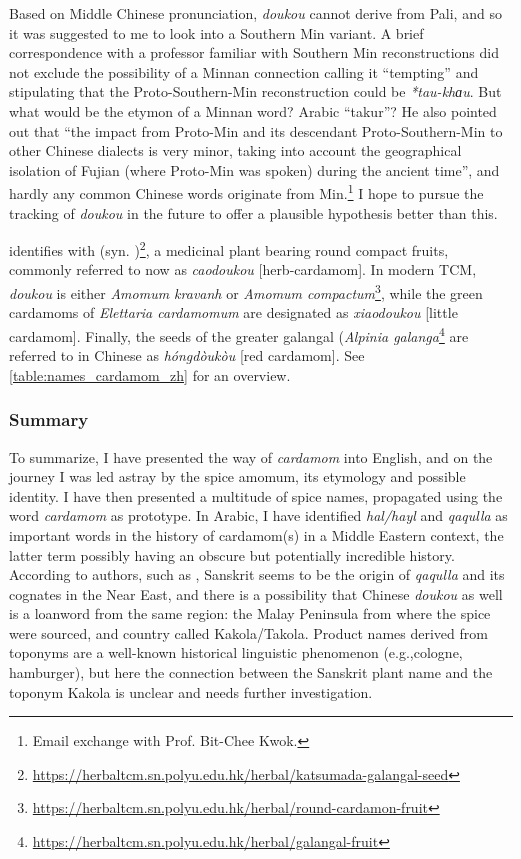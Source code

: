 Based on Middle Chinese pronunciation, \textit{doukou} cannot derive from Pali, and so it was suggested to me to look into a Southern Min variant. 
A brief correspondence with a professor familiar with Southern Min reconstructions did not exclude the possibility of a Minnan connection calling it ``tempting'' and stipulating that the Proto-Southern-Min reconstruction could be \textit{*tau-khɑu}. But what would be the etymon of a Minnan word? Arabic ``takur''? He also pointed out that ``the impact from Proto-Min and its descendant Proto-Southern-Min to other Chinese dialects is very minor, taking into account the geographical isolation of Fujian (where Proto-Min was spoken) during the ancient time'', and hardly any common Chinese words originate from Min.\footnote{Email exchange with Prof. Bit-Chee Kwok.} I hope to pursue the tracking of \textit{doukou} in the future to offer a plausible hypothesis better than this.



\textcite[729]{zhang_dictionary_2015} identifies  with  (syn. )\footnote{\url{https://herbaltcm.sn.polyu.edu.hk/herbal/katsumada-galangal-seed}}, a medicinal plant bearing round compact fruits, commonly referred to now as  \textit{caodoukou} [herb-cardamom]. In modern \gls{TCM}, \textit{doukou} is either \textit{Amomum kravanh} or \textit{Amomum compactum}\footnote{\url{https://herbaltcm.sn.polyu.edu.hk/herbal/round-cardamon-fruit}}, while the green cardamoms of \textit{Elettaria cardamomum} are designated as  \textit{xiaodoukou} [little cardamom]. Finally, the seeds of the greater galangal (\textit{Alpinia galanga}\footnote{\url{https://herbaltcm.sn.polyu.edu.hk/herbal/galangal-fruit}} are referred to in Chinese as 	\textit{hóngdòukòu} [red cardamom]. See \cref{table:names_cardamom_zh} for an overview.

\subsubsection{Summary}

To summarize, I have presented the way of \textit{cardamom} into English, and on the journey I was led astray by the spice amomum, its etymology and possible identity. I have then presented a multitude of spice names, propagated using the word \textit{cardamom} as prototype. In Arabic, I have identified \textit{hal/hayl} and \textit{qaqulla} as important words in the history of cardamom(s) in a Middle Eastern context, the latter term possibly having an obscure but potentially incredible history. According to authors, such as \textcite{donkin_between_2003}, Sanskrit seems to be the origin of \textit{qaqulla} and its cognates in the Near East, and there is a possibility that Chinese \textit{doukou} as well is a loanword from the same region: the Malay Peninsula from where the spice were sourced, and country called Kakola/Takola. Product names derived from toponyms are a well-known historical linguistic phenomenon (e.g.,cologne, hamburger), but here the connection between the Sanskrit plant name and the toponym Kakola is unclear and needs further investigation.

